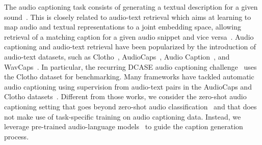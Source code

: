\documentclass{article}
\newcommand{\mypara}[1]{\vspace{2pt}\noindent{\bf{#1}}}
\begin{document}
\mypara{Audio captioning.} The audio captioning task consists of generating a textual description for a given sound~\cite{drossos2017automated}. This is closely related to audio-text retrieval which aims at learning to map audio and textual representations to a joint embedding space, allowing retrieval of a matching caption for a given audio snippet and vice versa~\cite{Oncescu21a,laionclap2023,slaney2002semantic,koepke2022audio,lou2022audio,Wu2022LargescaleCL}.
Audio captioning and audio-text retrieval have been popularized by the introduction of audio-text datasets, such as Clotho~\cite{drossos2020clotho}, AudioCaps~\cite{kim2019audiocaps}, Audio Caption~\cite{wu2019audio}, and WavCaps~\cite{mei2023wavcaps}.
In particular, the recurring DCASE audio captioning challenge~\cite{Dcase22} uses the Clotho dataset for benchmarking.
Many frameworks have tackled automatic audio captioning using supervision from audio-text pairs in the AudioCaps and Clotho datasets~\cite{koizumi2020audio,xu2021investigating,eren2020audio,mei2021audio,liu2021cl4ac,Kim2022ExploringTA,Gontier2021AutomatedAC,Chen2023VASTAV,Chen2023VALORVO}. Different from those works, we consider the zero-shot audio captioning setting that goes beyond zero-shot audio classification~\cite{Guzhov2021AudioclipEC} and that does not make use of task-specific training on audio captioning data. Instead, we leverage pre-trained audio-language models~\cite{Mei2023WavCapsAC} to guide the caption generation process.
\end{document}
